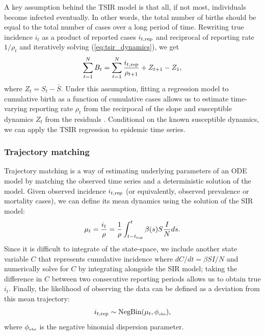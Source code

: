 \documentclass{article}
\newcommand{\eref}[1]{(\ref{eq:#1})}
\newcommand{\tsub}[2]{#1_{{\textrm{\tiny #2}}}}
\begin{document}
A key assumption behind the TSIR model is that all, if not most, individuals become infected eventually.
In other words, the total number of births should be equal to the total number of cases over a long period of time.
Rewriting true incidence $i_t$ as a product of reported cases $i_{t, {\tiny \textrm{rep}}}$ and reciprocal of reporting rate $1/\rho_t$ and iteratively solving \eref{tsir_dynamics}, we get
\begin{equation}
\sum_{t=1}^N B_t = \sum_{t=1}^N \frac{i_{t, {\tiny \textrm{rep}}}}{\rho_{t+1}} + Z_{t+1} - Z_1,
\end{equation}
where $Z_t = S_t - \bar{S}$.
Under this assumption, fitting a regression model to cumulative birth as a function of cumulative cases allows us to estimate time-varying reporting rate $\rho_t$ from the recirpocal of the slope and susceptible dynamics $Z_t$ from the residuals \citep{finkenstadt2000time}.
Conditional on the known susceptible dynamics, we can apply the TSIR regression \label{eq:tsir} to epidemic time series.

\subsubsection*{Trajectory matching}

Trajectory matching is a way of estimating underlying parameters of an ODE model by matching the observed time series and a deterministic solution of the model.
Given observed incidence $i_{t, {\tiny \textrm{rep}}}$ (or equivalently, observed prevalence or mortality cases), we can define its mean dynamics using the solution of the SIR model:
\begin{equation}
\mu_t = \frac{i_t}{\rho} = \frac{1}{\rho} \int_{t-\tsub{t}{rep}}^{t} \beta(s) S \frac{I}{N} ds.
\end{equation}
Since it is difficult to integrate of the state-space, we include another state variable $C$ that represents cumulative incidence where $dC/dt = \beta SI/N$ and numerically solve for $C$ by integrating alongside the SIR model; taking the difference in $C$ between two consecutive reporting periods allows us to obtain true $i_t$.
Finally, the likelihood of observing the data can be defined as a deviation from this mean trajectory:
\begin{equation}
i_{t, {\tiny \textrm{rep}}} \sim \mathrm{NegBin}(\mu_t, \tsub{\phi}{obs}),
\end{equation}
where $\tsub{\phi}{obs}$ is the negative binomial dispersion parameter.
\end{document}

